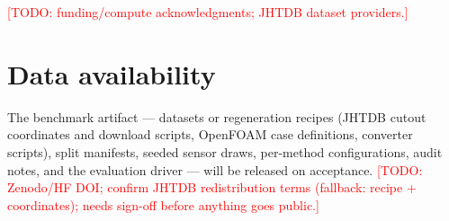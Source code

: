 \documentclass[aip,pof,reprint,amsmath,amssymb,superscriptaddress]{revtex4-1}
\newcommand{\todo}[1]{\textcolor{red}{[TODO: #1]}}
\begin{document}
\begin{acknowledgments}
\todo{funding/compute acknowledgments; JHTDB dataset
providers.}
\end{acknowledgments}

\section*{Data availability}
The benchmark artifact --- datasets or regeneration recipes (JHTDB cutout
coordinates and download scripts, OpenFOAM case definitions, converter
scripts), split manifests, seeded sensor draws, per-method configurations,
audit notes, and the evaluation driver --- will be released on acceptance.
\todo{Zenodo/HF DOI; confirm JHTDB redistribution terms (fallback: recipe +
coordinates); needs sign-off before anything goes public.}


\end{document}
